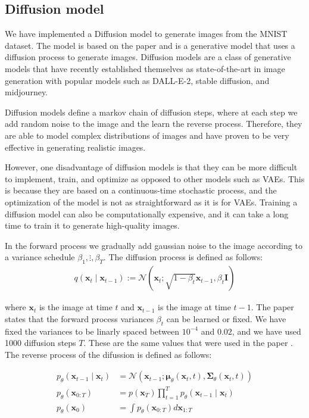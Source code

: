 \subsection*{Diffusion model}

We have implemented a Diffusion model to generate images from the MNIST dataset. The model is based on the paper \cite{diffusion} and is a generative model that uses a diffusion process to generate images. Diffusion models are a class of generative models that have recently established themselves as state-of-the-art in image generation with popular models such as DALL-E-2, stable diffusion, and midjourney.

Diffusion models define a markov chain of diffusion steps, where at each step we add random noise to the image and the learn the reverse process. Therefore, they are able to model complex distributions of images and have proven to be very effective in generating realistic images. 

However, one disadvantage of diffusion models is that they can be more difficult to implement, train, and optimize as opposed to other models such as VAEs. This is because they are based on a continuous-time stochastic process, and the optimization of the model is not as straightforward as it is for VAEs. Training a diffusion model can also be computationally expensive, and it can take a long time to train it to generate high-quality images.

In the forward process we gradually add gaussian noise to the image according to a variance schedule $\beta_1, \vdots, \beta_T$. The diffusion process is defined as follows:
\begin{align*}
    q\left(\mathbf{x}_t \mid \mathbf{x}_{t-1}\right):=\mathcal{N}\left(\mathbf{x}_t ; \sqrt{1-\beta_t} \mathbf{x}_{t-1}, \beta_t \mathbf{I}\right)
\end{align*}

where $\mathbf{x}_t$ is the image at time $t$ and $\mathbf{x}_{t-1}$ is the image at time $t-1$. The paper \cite{diffusion} states that the forward process variances $\beta_t$ can be learned or fixed. We have fixed the variances to be linarly spaced between $10^{-4}$ and $0.02$, and we have used 1000 diffusion steps $T$. These are the same values that were used in the paper \cite{diffusion}. The reverse process of the difussion is defined as follows:

\begin{align*}
    p_\theta\left(\mathbf{x}_{t-1} \mid \mathbf{x}_t\right)&=\mathcal{N}\left(\mathbf{x}_{t-1} ; \boldsymbol{\mu}_\theta\left(\mathbf{x}_t, t\right), \boldsymbol{\Sigma}_\theta\left(\mathbf{x}_t, t\right)\right)\\
    p_\theta\left(\mathbf{x}_{0: T}\right)&=p\left(\mathbf{x}_T\right) \prod_{t=1}^T p_\theta\left(\mathbf{x}_{t-1} \mid \mathbf{x}_t\right)\\
    p_\theta\left(\mathbf{x}_0\right) &=\int p_\theta\left(\mathbf{x}_{0: T}\right) d \mathbf{x}_{1: T}
\end{align*}

